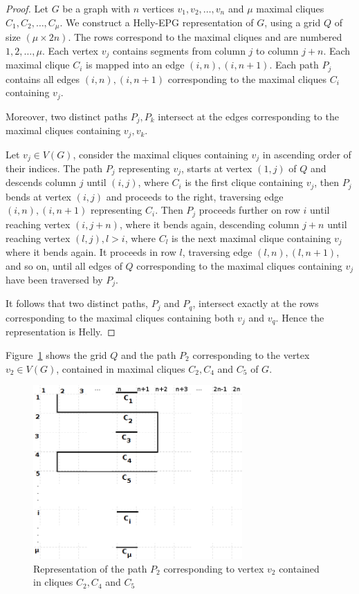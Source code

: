 \documentclass[
submission
]{dmtcs-episciences}
\begin{document}
%   
 \begin{proof}  %
  Let $G$ be a graph with $n$ vertices $v_1, v_2, \dots, v_n$ and $\mu$ maximal cliques $C_1, C_2, \dots , C_{\mu }$. We construct a Helly-EPG representation of $G$, using a grid $Q$ of size $(\mu \times 2n)$. The rows correspond to the maximal cliques and are numbered $1, 2, \dots , \mu$. Each vertex $v_j$ contains segments from column $j$ to column $j+n$. Each maximal clique $C_i$ is mapped into an edge $(i,n), (i,n+1)$. Each path $P_j$ contains all edges $(i,n), (i,n+1)$ corresponding to the maximal cliques $C_i$ containing $v_j$.
  
  Moreover, two distinct paths $P_j,P_k$ intersect at the edges corresponding to the maximal cliques containing $v_j,v_k$.
  
  Let $v_j \in V(G)$, consider the maximal cliques containing $v_j$ in ascending order of their indices. The path $P_j$ representing $v_j$, starts at vertex $(1,j)$ of $Q$ and descends column $j$ until $(i,j)$, where $C_i$ is the first clique containing $v_j$, then $P_j$ bends at vertex $(i,j)$ and proceeds to the right, traversing edge $(i,n), (i,n+1)$ representing $C_i$. Then $P_j$ proceeds further on row $i$ until reaching vertex $(i, j+n)$, where it bends again, descending column $j+n$ until reaching vertex $(l,j), l>i$, where $C_l$ is the next maximal clique containing $v_j$ where it bends again. It proceeds in row $l$, traversing edge $(l,n),(l,n+1)$, and so on, until all edges of $Q$ corresponding to the maximal cliques containing $v_j$ have been traversed by $P_j$.   
  
It follows that two distinct paths, $P_j$ and $P_q$, intersect exactly at the rows corresponding to the maximal cliques containing both $v_j$ and $v_q$.  Hence the representation is Helly.
   \end{proof}
 
 Figure~\ref{fig:gradeDemonstracao} shows the grid $Q$ and the path $P_2$ corresponding to the vertex $v_2 \in V(G)$, contained in maximal cliques $C_2, C_4$ and $C_5$ of $G$.
 
  \begin{figure}[htb]	
\center%
\includegraphics[width=8cm]{grade3}
\caption{Representation of the path $P_2$ corresponding to vertex $v_2$ contained in cliques $C_2, C_4$ and $C_5$}
\label{fig:gradeDemonstracao}
\end{figure}
 
\end{document}
